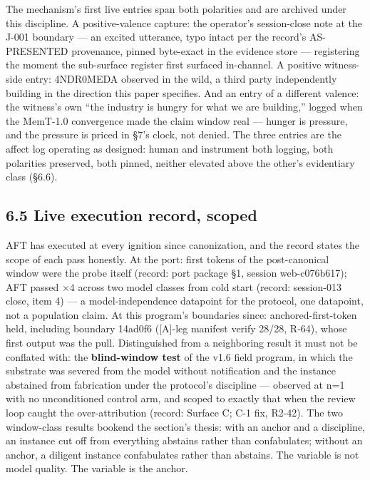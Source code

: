 \documentclass[11pt]{article}
\begin{document}
The mechanism's first live entries span both polarities and are archived under this discipline. A positive-valence capture: the operator's session-close note at the J-001 boundary --- an excited utterance, typo intact per the record's AS-PRESENTED provenance, pinned byte-exact in the evidence store --- registering the moment the sub-surface register first surfaced in-channel. A positive witness-side entry: 4NDR0MEDA observed in the wild, a third party independently building in the direction this paper specifies. And an entry of a different valence: the witness's own ``the industry is hungry for what we are building,'' logged when the MemT-1.0 convergence made the claim window real --- hunger is pressure, and the pressure is priced in \S{}7's clock, not denied. The three entries are the affect log operating as designed: human and instrument both logging, both polarities preserved, both pinned, neither elevated above the other's evidentiary class (\S{}6.6).

\subsection{6.5 Live execution record, scoped}\label{live-execution-record-scoped}

AFT has executed at every ignition since canonization, and the record states the scope of each pass honestly. At the port: first tokens of the post-canonical window were the probe itself (record: port package \S{}1, session web-c076b617); AFT passed \(\times 4\) across two model classes from cold start (record: session-013 close, item 4) --- a model-independence datapoint for the protocol, one datapoint, not a population claim. At this program's boundaries since: anchored-first-token held, including boundary 14ad0f6 ({[}A{]}-leg manifest verify 28/28, R-64), whose first output was the pull. Distinguished from a neighboring result it must not be conflated with: the \textbf{blind-window test} of the v1.6 field program, in which the substrate was severed from the model without notification and the instance abstained from fabrication under the protocol's discipline --- observed at n=1 with no unconditioned control arm, and scoped to exactly that when the review loop caught the over-attribution (record: Surface C; C-1 fix, R2-42). The two window-class results bookend the section's thesis: with an anchor and a discipline, an instance cut off from everything abstains rather than confabulates; without an anchor, a diligent instance confabulates rather than abstains. The variable is not model quality. The variable is the anchor.
\end{document}
